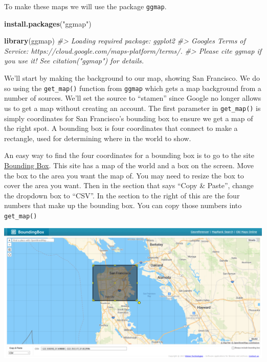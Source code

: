 \documentclass[
  12pt,
]{book}
\newenvironment{Shaded}{\begin{snugshade}}{\end{snugshade}}
\newcommand{\CommentTok}[1]{\textcolor[rgb]{0.37,0.37,0.37}{\textit{#1}}}
\newcommand{\KeywordTok}[1]{\textcolor[rgb]{0.27,0.27,0.27}{\textbf{#1}}}
\newcommand{\NormalTok}[1]{#1}
\newcommand{\StringTok}[1]{\textcolor[rgb]{0.5,0.5,0.5}{#1}}
\begin{document}
To make these maps we will use the package \texttt{ggmap}.

\begin{Shaded}
\begin{Highlighting}[]
\KeywordTok{install.packages}\NormalTok{(}\StringTok{"ggmap"}\NormalTok{)}
\end{Highlighting}
\end{Shaded}

\begin{Shaded}
\begin{Highlighting}[]
\KeywordTok{library}\NormalTok{(ggmap)}
\CommentTok{\#> Loading required package: ggplot2}
\CommentTok{\#> Google\textquotesingle{}s Terms of Service: https://cloud.google.com/maps{-}platform/terms/.}
\CommentTok{\#> Please cite ggmap if you use it! See citation("ggmap") for details.}
\end{Highlighting}
\end{Shaded}

We'll start by making the background to our map, showing San Francisco. We do so using the \texttt{get\_map()} function from \texttt{ggmap} which gets a map background from a number of sources. We'll set the source to ``stamen'' since Google no longer allows us to get a map without creating an account. The first parameter in \texttt{get\_map()} is simply coordinates for San Francisco's bounding box to ensure we get a map of the right spot. A bounding box is four coordinates that connect to make a rectangle, used for determining where in the world to show.

An easy way to find the four coordinates for a bounding box is to go to the site \href{https://boundingbox.klokantech.com/}{Bounding Box}. This site has a map of the world and a box on the screen. Move the box to the area you want the map of. You may need to resize the box to cover the area you want. Then in the section that says ``Copy \& Paste'', change the dropdown box to ``CSV''. In the section to the right of this are the four numbers that make up the bounding box. You can copy those numbers into \texttt{get\_map()}

\includegraphics{images/bounding_box.PNG}
\end{document}
